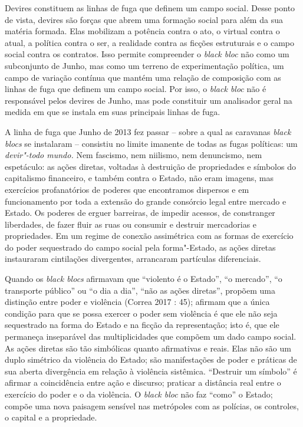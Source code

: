 Devires constituem as linhas de fuga que definem um campo social. Desse
ponto de vista, devires são forças que abrem uma formação social para
além da sua matéria formada. Elas mobilizam a potência contra o ato, o
virtual contra o atual, a política contra o ser, a realidade contra as
ficções estruturais e o campo social contra os contratos. Isso permite
compreender o \emph{black bloc }não como um subconjunto de Junho, mas
como um terreno de experimentação política, um campo de variação
contínua que mantém uma relação de composição com as linhas de fuga que
definem um campo social. Por isso, o \emph{black bloc }não é responsável
pelos devires de Junho, mas pode constituir um analisador geral na
medida em que se instala em suas principais linhas de fuga.

A linha de fuga que Junho de 2013 fez passar -- sobre a qual as
caravanas \emph{black blocs} se instalaram -- consistiu no limite
imanente de todas as fugas políticas: um \emph{devir"-todo mundo.} Nem
fascismo, nem niilismo, nem denuncismo, nem espetáculo: as ações
diretas, voltadas à destruição de propriedades e símbolos do capitalismo
financeiro, e também contra o Estado, não eram imagens, mas exercícios
profanatórios de poderes que encontramos dispersos e em funcionamento
por toda a extensão do grande consórcio legal entre mercado e Estado. Os
poderes de erguer barreiras, de impedir acessos, de constranger
liberdades, de fazer fluir as ruas ou consumir e destruir mercadorias e
propriedades. Em um regime de conexão assimétrica com as formas de
exercício do poder sequestrado do campo social pela forma"-Estado, as
ações diretas instauraram cintilações divergentes, arrancaram partículas
diferenciais.

Quando os \emph{black blocs} afirmavam que ``violento é o Estado'', ``o
mercado'', ``o transporte público'' ou ``o dia a dia'', ``não as ações
diretas'', propõem uma distinção entre poder e violência (Correa 2017 :
45); afirmam que a única condição para que se possa exercer o poder sem
violência é que ele não seja sequestrado na forma do Estado e na ficção
da representação; isto é, que ele permaneça inseparável das
multiplicidades que compõem um dado campo social. As ações diretas são
tão simbólicas quanto afirmativas e reais. Elas não são um duplo
simétrico da violência do Estado; são manifestações de poder e práticas
de sua aberta divergência em relação à violência sistêmica. ``Destruir
um símbolo'' é afirmar a coincidência entre ação e discurso; praticar a
distância real entre o exercício do poder e o da violência. O
\emph{black bloc} não faz ``como'' o Estado; compõe uma nova paisagem
sensível nas metrópoles com as polícias, os controles, o capital e a
propriedade.

